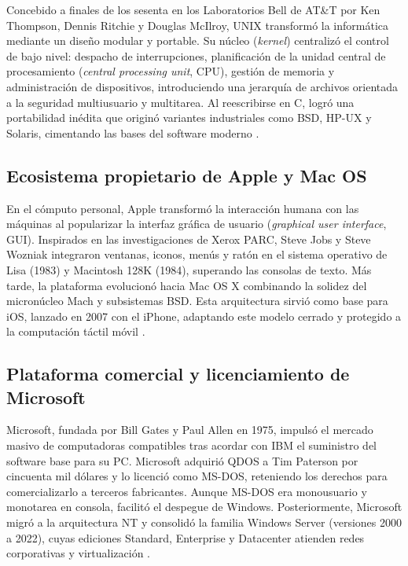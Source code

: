 \documentclass[12pt]{article}
\begin{document}
Concebido a finales de los sesenta en los Laboratorios Bell de AT\&T por Ken Thompson, Dennis Ritchie y Douglas McIlroy, UNIX transformó la informática mediante un diseño modular y portable. Su núcleo (\textit{kernel}) centralizó el control de bajo nivel: despacho de interrupciones, planificación de la unidad central de procesamiento (\textit{central processing unit}, CPU), gestión de memoria y administración de dispositivos, introduciendo una jerarquía de archivos orientada a la seguridad multiusuario y multitarea. Al reescribirse en C, logró una portabilidad inédita que originó variantes industriales como BSD, HP-UX y Solaris, cimentando las bases del software moderno \parencite[plantillas 22--24]{mercado2026tema1}.

\subsection*{Ecosistema propietario de Apple y Mac OS}

En el cómputo personal, Apple transformó la interacción humana con las máquinas al popularizar la interfaz gráfica de usuario (\textit{graphical user interface}, GUI). Inspirados en las investigaciones de Xerox PARC, Steve Jobs y Steve Wozniak integraron ventanas, iconos, menús y ratón en el sistema operativo de Lisa (1983) y Macintosh 128K (1984), superando las consolas de texto. Más tarde, la plataforma evolucionó hacia Mac OS X combinando la solidez del micronúcleo Mach y subsistemas BSD. Esta arquitectura sirvió como base para iOS, lanzado en 2007 con el iPhone, adaptando este modelo cerrado y protegido a la computación táctil móvil \parencite[plantillas 25--34]{mercado2026tema1}.

\subsection*{Plataforma comercial y licenciamiento de Microsoft}

Microsoft, fundada por Bill Gates y Paul Allen en 1975, impulsó el mercado masivo de computadoras compatibles tras acordar con IBM el suministro del software base para su PC. Microsoft adquirió QDOS a Tim Paterson por cincuenta mil dólares y lo licenció como MS-DOS, reteniendo los derechos para comercializarlo a terceros fabricantes. Aunque MS-DOS era monousuario y monotarea en consola, facilitó el despegue de Windows. Posteriormente, Microsoft migró a la arquitectura NT y consolidó la familia Windows Server (versiones 2000 a 2022), cuyas ediciones Standard, Enterprise y Datacenter atienden redes corporativas y virtualización \parencite[plantillas 35--40]{mercado2026tema1}.
\end{document}
